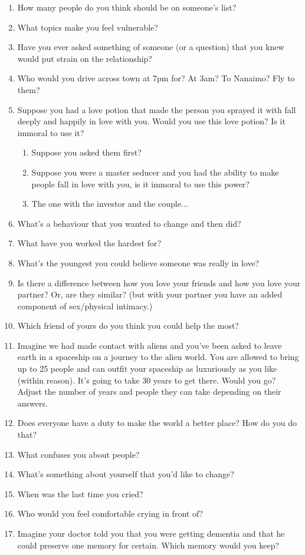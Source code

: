 \documentclass[11pt]{article}
\begin{document}
\begin{enumerate}
	\item How many people do you think should be on someone's list? 
	\item What topics make you feel vulnerable?
	\item Have you ever asked something of someone (or a question) that you knew would put strain on the relationship?
	\item Who would you drive across town at 7pm for? At 3am? To Nanaimo? Fly to them?
	\item Suppose you had a love potion that made the person you sprayed it with fall deeply and happily in love with you.
		Would you use this love potion? Is it immoral to use it?
		\begin{enumerate}
			\item Suppose you asked them first?
			\item Suppose you were a master seducer and you had the ability to make people fall in love with you, is it 
				immoral to use this power?

			\item The one with the investor and the couple...
		\end{enumerate}

	\item What's a behaviour that you wanted to change and then did?
	\item What have you worked the hardest for?
	\item What's the youngest you could believe someone was really in love?
	\item Is there a difference between how you love your friends and how you love your partner? Or, are they similar? (but with your partner you have an added component of sex/physical intimacy.)
	\item Which friend of yours do you think you could help the most?
	\item Imagine we had made contact with aliens and you've been asked to leave earth in a spaceship on a journey to the alien 
		world. You are allowed to bring up to 25 people and can outfit your spaceship as luxuriously as you like (within reason).
		It's going to take 30 years to get there. Would you go? Adjust the number of years and people they can take depending on 
		their answers.
	\item Does everyone have a duty to make the world a better place? How do you do that?
	\item What confuses you about people?
	\item What's something about yourself that you'd like to change?
	\item When was the last time you cried?
	\item Who would you feel comfortable crying in front of?
	\item Imagine your doctor told you that you were getting dementia and that he could preserve one memory for certain.
		Which memory would you keep?
	

\end{enumerate}
\end{document}
